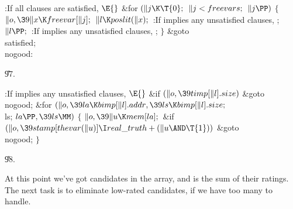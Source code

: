 \B{}:If all clauses are satisfied, \X${}\E{}$\6
\&{for} ${}(\|j\K\T{0};{}$ ${}\|j<\\{freevars};{}$ ${}\|j\PP){}$\5
${}\{{}$\1\6
${}\|o,\39\|x\K\\{freevar}[\|j];{}$\6
${}\|l\K\\{poslit}(\|x);{}$\6
:If  implies any unsatisfied clauses, \X;\6
${}\|l\PP;{}$\6
:If  implies any unsatisfied clauses, \X;\6
\4${}\}{}$\2\6
\&{goto} \\{satisfied};\6
\4\\{nogood}:\par
\U97.\fi

\B{}:If  implies any unsatisfied clauses, \X${}\E{}$\6
\&{if} ${}(\|o,\39\\{timp}[\|l].\\{size}){}$\1\5
\&{goto} \\{nogood};\2\6
\&{for} ${}(\|o,\39\\{la}\K\\{bimp}[\|l].\\{addr},\39\\{ls}\K\\{bimp}[\|l].%
\\{size};{}$ \\{ls}; ${}\\{la}\PP,\39\\{ls}\MM){}$\5
${}\{{}$\1\6
${}\|o,\39\|u\K\\{mem}[\\{la}];{}$\6
\&{if} ${}(\|o,\39\\{stamp}[\\{thevar}(\|u)]\I\\{real\_truth}+(\|u\AND%
\T{1})){}$\1\5
\&{goto} \\{nogood};\2\6
\4${}\}{}$\2\par
\U98.\fi

At this point we've got  candidates in the %
 array,
and  is the sum of their ratings. The next task is to eliminate
low-rated candidates, if we have too many to handle.


